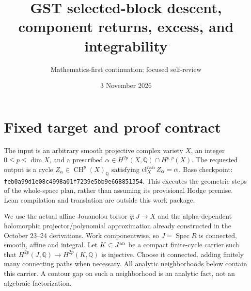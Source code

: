\documentclass[11pt]{article}
\title{GST selected-block descent, component returns, excess, and integrability}
\author{Mathematics-first continuation; focused self-review}
\date{3 November 2026}
\newcommand{\Q}{\mathbb Q}
\newcommand{\CH}{\operatorname{CH}}
\begin{document}
\maketitle

\section{Fixed target and proof contract}
The input is an arbitrary smooth projective complex variety $X$, an integer
$0\leq p\leq\dim X$, and a prescribed
$\alpha\in H^{2p}(X,\Q)\cap H^{p,p}(X)$.
The requested output is a cycle $Z_\alpha\in\CH^p(X)_\Q$ satisfying
$\operatorname{cl}^{\rm can}_X Z_\alpha=\alpha$.
Base checkpoint: \texttt{feb0a99d1e08c4998a01f7239e5bb9e668851354}.
This executes the geometric steps of the whole-space plan, rather than
assuming its provisional Hodge premise. Lean compilation and translation
are outside this work package.

We use the actual affine Jouanolou torsor $q:J\to X$ and the
alpha-dependent holomorphic projector/polynomial approximation already
constructed in the October 23--24 derivations. Work componentwise, so
$J=\operatorname{Spec}R$ is connected, smooth, affine and integral.
Let $K\subset J^{\rm an}$ be a compact finite-cycle carrier such that
$H^{2p}(J,\Q)\to H^{2p}(K,\Q)$ is injective.
Choose it connected, adding finitely many connecting paths when necessary.
All analytic neighborhoods below contain this carrier. A contour gap on
such a neighborhood is an analytic fact, not an algebraic factorization.
\end{document}

